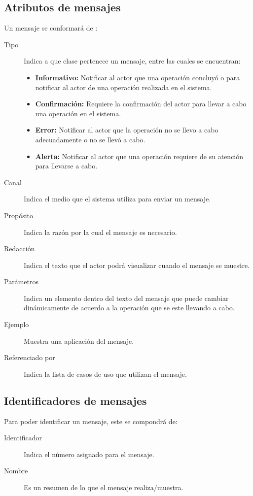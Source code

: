 \subsection{Atributos de mensajes}
Un mensaje se conformará de :
\begin{description}
	\item[Tipo] Indica a que clase pertenece un mensaje, entre las cuales se encuentran:
		\begin{itemize}
			\item \textbf{Informativo:} Notificar al actor que una operación concluyó o para notificar al actor de una operación realizada en el sistema.
			\item \textbf{Confirmación:} Requiere la confirmación del actor para llevar a cabo una operación en el sistema.
			\item \textbf{Error:} Notificar al actor que la operación no se llevo a cabo adecuadamente o no se llevó a cabo.
			\item \textbf{Alerta:} Notificar al actor que una operación requiere de su atención para llevarse a cabo.
		\end{itemize}
	\item[Canal] Indica el medio que el sistema utiliza para enviar un mensaje.
	\item[Propósito] Indica la razón por la cual el mensaje es necesario.
	\item[Redacción] Indica el texto que el actor podrá visualizar cuando el mensaje se muestre.
	\item[Parámetros] Indica un elemento dentro del texto del mensaje que puede cambiar dinámicamente de acuerdo a la operación que se este llevando a cabo.
	\item[Ejemplo] Muestra una aplicación del mensaje.
	\item[Referenciado por] Indica la lista de casos de uso que utilizan el mensaje.
\end{description}

\subsection{Identificadores de mensajes}
Para poder identificar un mensaje, este se compondrá de:
\begin{description}
	\item [Identificador] Indica el número asignado para el mensaje.
	\item [Nombre] Es un resumen de lo que el mensaje realiza/muestra.
\end{description}
